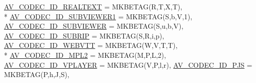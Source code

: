 \begin{DoxyCompactItemize}
\hyperlink{group__lavc__core_ggaadca229ad2c20e060a14fec08a5cc7cea55663844c2d62417ed219aa128132506}{A\+V\+\_\+\+C\+O\+D\+E\+C\+\_\+\+I\+D\+\_\+\+R\+E\+A\+L\+T\+E\+XT} = M\+K\+B\+E\+T\+AG(\textquotesingle{}R\textquotesingle{},\textquotesingle{}T\textquotesingle{},\textquotesingle{}X\textquotesingle{},\textquotesingle{}T\textquotesingle{}), 
\\*
\hyperlink{group__lavc__core_ggaadca229ad2c20e060a14fec08a5cc7cea7b6c6b49e41933c1f83207b9653b8c7b}{A\+V\+\_\+\+C\+O\+D\+E\+C\+\_\+\+I\+D\+\_\+\+S\+U\+B\+V\+I\+E\+W\+E\+R1} = M\+K\+B\+E\+T\+AG(\textquotesingle{}S\textquotesingle{},\textquotesingle{}b\textquotesingle{},\textquotesingle{}V\textquotesingle{},\textquotesingle{}1\textquotesingle{}), 
\hyperlink{group__lavc__core_ggaadca229ad2c20e060a14fec08a5cc7ceaad683f0e2cd34f5c9f6c2ff813061e71}{A\+V\+\_\+\+C\+O\+D\+E\+C\+\_\+\+I\+D\+\_\+\+S\+U\+B\+V\+I\+E\+W\+ER} = M\+K\+B\+E\+T\+AG(\textquotesingle{}S\textquotesingle{},\textquotesingle{}u\textquotesingle{},\textquotesingle{}b\textquotesingle{},\textquotesingle{}V\textquotesingle{}), 
\hyperlink{group__lavc__core_ggaadca229ad2c20e060a14fec08a5cc7cea5b0708bf7c0276316672f513b4dded18}{A\+V\+\_\+\+C\+O\+D\+E\+C\+\_\+\+I\+D\+\_\+\+S\+U\+B\+R\+IP} = M\+K\+B\+E\+T\+AG(\textquotesingle{}S\textquotesingle{},\textquotesingle{}R\textquotesingle{},\textquotesingle{}i\textquotesingle{},\textquotesingle{}p\textquotesingle{}), 
\hyperlink{group__lavc__core_ggaadca229ad2c20e060a14fec08a5cc7cea82b722838aa5158de9313be99930618a}{A\+V\+\_\+\+C\+O\+D\+E\+C\+\_\+\+I\+D\+\_\+\+W\+E\+B\+V\+TT} = M\+K\+B\+E\+T\+AG(\textquotesingle{}W\textquotesingle{},\textquotesingle{}V\textquotesingle{},\textquotesingle{}T\textquotesingle{},\textquotesingle{}T\textquotesingle{}), 
\\*
\hyperlink{group__lavc__core_ggaadca229ad2c20e060a14fec08a5cc7cea160f5b01bf93dbc3352af1c0a001cefd}{A\+V\+\_\+\+C\+O\+D\+E\+C\+\_\+\+I\+D\+\_\+\+M\+P\+L2} = M\+K\+B\+E\+T\+AG(\textquotesingle{}M\textquotesingle{},\textquotesingle{}P\textquotesingle{},\textquotesingle{}L\textquotesingle{},\textquotesingle{}2\textquotesingle{}), 
\hyperlink{group__lavc__core_ggaadca229ad2c20e060a14fec08a5cc7cea9321895a9caaedf1afcce047ffe21606}{A\+V\+\_\+\+C\+O\+D\+E\+C\+\_\+\+I\+D\+\_\+\+V\+P\+L\+A\+Y\+ER} = M\+K\+B\+E\+T\+AG(\textquotesingle{}V\textquotesingle{},\textquotesingle{}P\textquotesingle{},\textquotesingle{}l\textquotesingle{},\textquotesingle{}r\textquotesingle{}), 
\hyperlink{group__lavc__core_ggaadca229ad2c20e060a14fec08a5cc7cea28212eff72ec33ced01dc2e20f742644}{A\+V\+\_\+\+C\+O\+D\+E\+C\+\_\+\+I\+D\+\_\+\+P\+JS} = M\+K\+B\+E\+T\+AG(\textquotesingle{}P\textquotesingle{},\textquotesingle{}h\textquotesingle{},\textquotesingle{}J\textquotesingle{},\textquotesingle{}S\textquotesingle{}), 

\end{DoxyCompactItemize}
